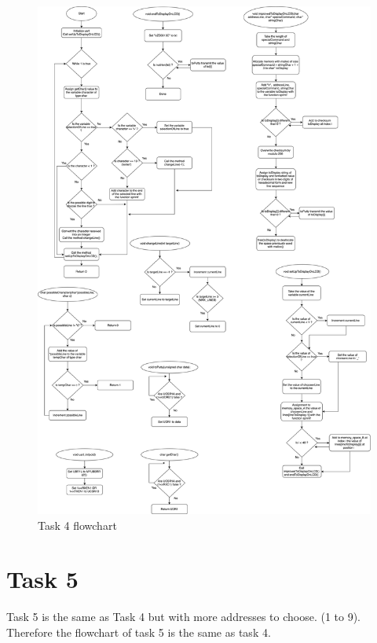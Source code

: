 \documentclass[a4paper,12pt]{article}
\begin{document}
\begin{figure}
\begin{center}
\includegraphics[width=\textwidth/1 ]{flowchart/task4_flowchart.png}
\end{center}
\caption{Task 4 flowchart}
\label{task4}
\end{figure}

\break
\section{Task 5}
Task 5 is the same as Task 4 but with more addresses to choose. (1 to 9). Therefore the flowchart of task 5 is the same as task 4.
\lstset{style=CStyle}

\begin{lstlisting}[style=CStyle]

\end{lstlisting}








\end{document}
